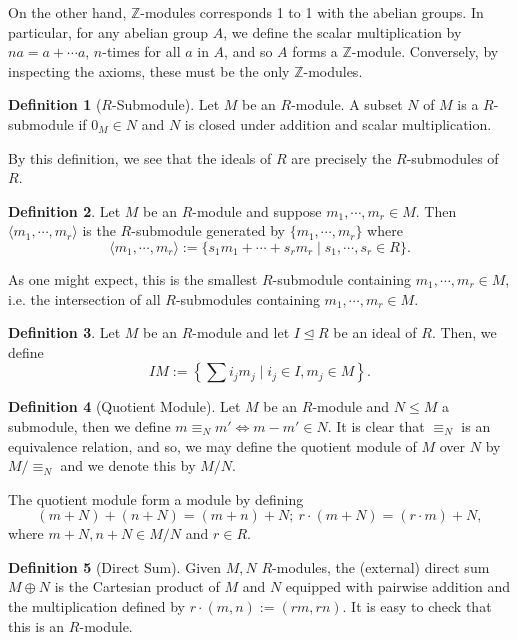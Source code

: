 \documentclass[]{article}
\theoremstyle{definition}
\theoremstyle{definition}
\newtheorem{definition}{Definition}[section]
\begin{document}
On the other hand, \(\mathbb{Z}\)-modules corresponds 1 to 1 with the 
abelian groups. In particular, for any abelian group \(A\), we define the 
scalar multiplication by \(na = a + \cdots a\), \(n\)-times for all \(a\) 
in \(A\), and so \(A\) forms a \(\mathbb{Z}\)-module. Conversely, by inspecting 
the axioms, these must be the only \(\mathbb{Z}\)-modules.

\begin{definition}[\(R\)-Submodule]
  Let \(M\) be an \(R\)-module. A subset \(N\) of \(M\) is a \(R\)-submodule 
  if \(0_M \in N\) and \(N\) is closed under addition and scalar 
  multiplication.
\end{definition}

By this definition, we see that the ideals of \(R\) are precisely the 
\(R\)-submodules of \(R\).

\begin{definition}
  Let \(M\) be an \(R\)-module and suppose \(m_1, \cdots, m_r \in M\). Then 
  \(\langle m_1, \cdots, m_r \rangle\) is the \(R\)-submodule generated by 
  \(\{m_1, \cdots, m_r\}\) where  
  \[\langle m_1, \cdots, m_r \rangle := 
    \{s_1m_1 + \cdots + s_r m_r \mid s_1, \cdots, s_r \in R\}.\]
\end{definition}

As one might expect, this is the smallest \(R\)-submodule containing 
\(m_1, \cdots, m_r \in M\), i.e. the intersection of all \(R\)-submodules 
containing \(m_1, \cdots, m_r \in M\).

\begin{definition}
  Let \(M\) be an \(R\)-module and let \(I \trianglelefteq R\) be an ideal of 
  \(R\). Then, we define 
  \[IM := \left\{\sum i_j m_j \mid i_j \in I, m_j \in M\right\}.\]
\end{definition}

\begin{definition}[Quotient Module]
  Let \(M\) be an \(R\)-module and \(N \le M\) a submodule, then we define 
  \(m \equiv_N m' \iff m - m' \in N\). It is clear that \(\equiv_N\) is an 
  equivalence relation, and so, we may define the quotient module 
  of \(M\) over \(N\) by \(M / \equiv_N\) and we denote this by 
  \(M / N\). 

  The quotient module form a module by defining 
  \[(m + N) + (n + N) = (m + n) + N;\ r \cdot (m + N) = (r \cdot m) + N,\]
  where \(m + N, n + N \in M / N\) and \(r \in R\).
\end{definition}

\begin{definition}[Direct Sum]
  Given \(M, N\) \(R\)-modules, the (external) direct sum \(M \oplus N\) is 
  the Cartesian product of \(M\) and \(N\) equipped with pairwise addition 
  and the multiplication defined by \(r \cdot (m, n) := (rm, rn)\). It is easy 
  to check that this is an \(R\)-module.
\end{definition}
\end{document}
